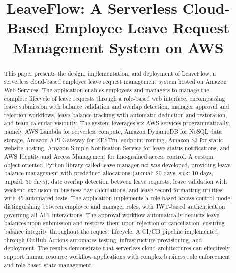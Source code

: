 \documentclass[conference]{IEEEtran}
\begin{document}
\title{LeaveFlow: A Serverless Cloud-Based Employee Leave Request Management System on AWS}

\author{
}

\maketitle

\begin{abstract}
This paper presents the design, implementation, and deployment of LeaveFlow, a serverless cloud-based employee leave request management system hosted on Amazon Web Services. The application enables employees and managers to manage the complete lifecycle of leave requests through a role-based web interface, encompassing leave submission with balance validation and overlap detection, manager approval and rejection workflows, leave balance tracking with automatic deduction and restoration, and team calendar visibility. The system leverages six AWS services programmatically, namely AWS Lambda for serverless compute, Amazon DynamoDB for NoSQL data storage, Amazon API Gateway for RESTful endpoint routing, Amazon S3 for static website hosting, Amazon Simple Notification Service for leave status notifications, and AWS Identity and Access Management for fine-grained access control. A custom object-oriented Python library called leave-manager-nci was developed, providing leave balance management with predefined allocations (annual: 20 days, sick: 10 days, unpaid: 30 days), date overlap detection between leave requests, leave validation with weekend exclusion in business day calculations, and leave record formatting utilities with 45 automated tests. The application implements a role-based access control model distinguishing between employee and manager roles, with JWT-based authentication governing all API interactions. The approval workflow automatically deducts leave balances upon submission and restores them upon rejection or cancellation, ensuring balance integrity throughout the request lifecycle. A CI/CD pipeline implemented through GitHub Actions automates testing, infrastructure provisioning, and deployment. The results demonstrate that serverless cloud architectures can effectively support human resource workflow applications with complex business rule enforcement and role-based state management.
\end{abstract}
\end{document}
